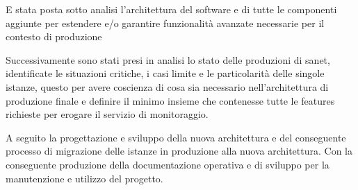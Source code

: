 E stata posta sotto analisi l'architettura del software e di tutte le componenti aggiunte per estendere e/o garantire funzionalità avanzate necessarie per il contesto di produzione

Successivamente sono stati presi in analisi lo stato delle produzioni di sanet, identificate le situazioni critiche, i casi limite e le particolarità delle singole istanze, questo per avere coscienza di cosa sia necessario nell'architettura di produzione finale e definire il minimo insieme che contenesse tutte le features richieste per erogare il servizio di monitoraggio.

A seguito la progettazione e sviluppo della nuova architettura e del conseguente processo di migrazione delle istanze in produzione alla nuova architettura. Con la conseguente produzione della documentazione operativa e di sviluppo per la manutenzione e utilizzo del progetto.
